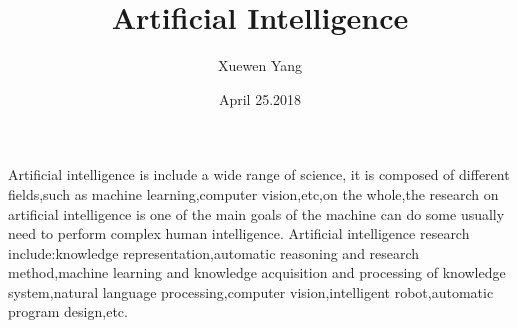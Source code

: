 \documentclass{article}
\author{Xuewen Yang}
\date{April 25.2018}
\title{Artificial Intelligence}
\begin{document}
\maketitle
Artificial intelligence is include a wide range of science, it is composed of different fields,such as machine learning,computer vision,etc,on the whole,the research on artificial intelligence is one of the main goals of the machine can do some usually need to perform complex human intelligence.
 Artificial intelligence research include:knowledge representation,automatic reasoning and research method,machine learning and knowledge acquisition and processing of knowledge system,natural language processing,computer vision,intelligent robot,automatic program design,etc.
\end{document}
